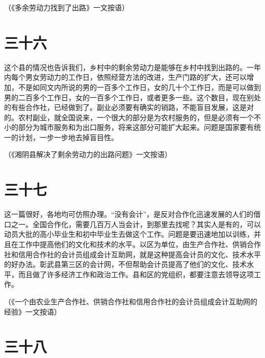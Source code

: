 （《多余劳动力找到了出路》一文按语）

\section*{三十六}

这个县的情况也告诉我们，乡村中的剩余劳动力是能够在乡村中找到出路的。一年内每个男女劳动力的工作日，依照经营方法的改进，生产门路的扩大，还可以增加，不是如同文内所说的男的一百多个工作日，女的几十个工作日，而是可以做到男的二百多个工作日，女的一百多个工作日，或者更多一些。这个数目，现在别处的有些合作社，已经做到了。副业必须要有确实的销路，不能盲目发展，这是对的。农村副业，就全国说来，一个很大的部分是为农村服务的，但是必须有一个不小的部分为城市服务和为出口服务，将来这部分可能扩大起来。问题是国家要有统一的计划，一步一步地去掉盲目性。


（《湘阴县解决了剩余劳动力的出路问题》一文按语）

\section*{三十七}

这一篇很好，各地均可仿照办理。“没有会计”，是反对合作化迅速发展的人们的借口之一。全国合作化，需要几百万人当会计，到那里去找呢？其实人是有的，可以动员大批的高小毕业生和初中毕业生去做这个工作。问题是要迅速地加以训练，并且在工作中提高他们的文化和技术的水平。以区为单位，由生产合作社、供销合作社和信用合作社的会计员组成会计互助网，就是这种提高会计员的文化、技术水平的好办法。彰武县第三区的会计网，不但帮助会计员提高了他们的文化、技术水平，而且做了许多经济工作和政治工作。县和区的党组织，都要注意去领导这项工作。


（《一个由农业生产合作社、供销合作社和信用合作社的会计员组成会计互助网的经验》一文按语）

\section*{三十八}

